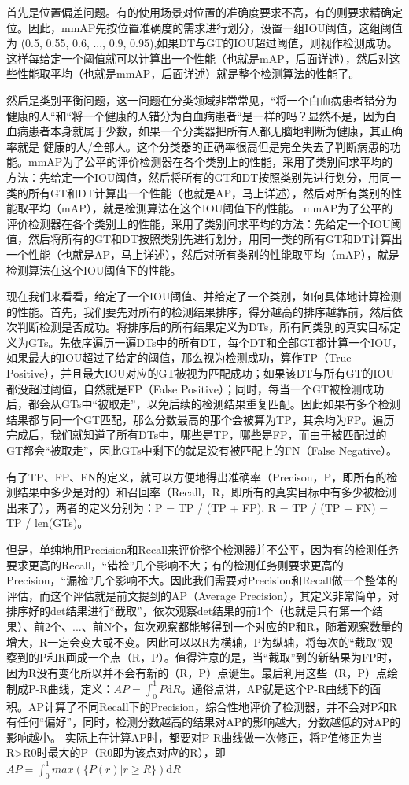 \documentclass[UTF8]{ctexart}
\begin{document}
首先是位置偏差问题。有的使用场景对位置的准确度要求不高，有的则要求精确定位。因此，mmAP先按位置准确度的需求进行划分，设置一组IOU阈值，这组阈值为 (0.5, 0.55, 0.6, ..., 0.9,
0.95),如果DT与GT的IOU超过阈值，则视作检测成功。这样每给定一个阈值就可以计算出一个性能（也就是mAP，后面详述），然后对这些性能取平均（也就是mmAP，后面详述）就是整个检测算法的性能了。

然后是类别平衡问题，这一问题在分类领域非常常见，“将一个白血病患者错分为健康的人“和“将一个健康的人错分为白血病患者“是一样的吗？显然不是，因为白血病患者本身就属于少数，如果一个分类器把所有人都无脑地判断为健康，其正确率就是 健康的人/全部人。这个分类器的正确率很高但是完全失去了判断病患的功能。mmAP为了公平的评价检测器在各个类别上的性能，采用了类别间求平均的方法：先给定一个IOU阈值，然后将所有的GT和DT按照类别先进行划分，用同一类的所有GT和DT计算出一个性能（也就是AP，马上详述），然后对所有类别的性能取平均（mAP），就是检测算法在这个IOU阈值下的性能。
mmAP为了公平的评价检测器在各个类别上的性能，采用了类别间求平均的方法：先给定一个IOU阈值，然后将所有的GT和DT按照类别先进行划分，用同一类的所有GT和DT计算出一个性能（也就是AP，马上详述），然后对所有类别的性能取平均（mAP），就是检测算法在这个IOU阈值下的性能。

现在我们来看看，给定了一个IOU阈值、并给定了一个类别，如何具体地计算检测的性能。首先，我们要先对所有的检测结果排序，得分越高的排序越靠前，然后依次判断检测是否成功。将排序后的所有结果定义为DTs，所有同类别的真实目标定义为GTs。先依序遍历一遍DTs中的所有DT，每个DT和全部GT都计算一个IOU，如果最大的IOU超过了给定的阈值，那么视为检测成功，算作TP（True Positive），并且最大IOU对应的GT被视为匹配成功；如果该DT与所有GT的IOU都没超过阈值，自然就是FP（False Positive）；同时，每当一个GT被检测成功后，都会从GTs中“被取走”，以免后续的检测结果重复匹配。因此如果有多个检测结果都与同一个GT匹配，那么分数最高的那个会被算为TP，其余均为FP。遍历完成后，我们就知道了所有DTs中，哪些是TP，哪些是FP，而由于被匹配过的GT都会“被取走”，因此GTs中剩下的就是没有被匹配上的FN（False Negative）。

有了TP、FP、FN的定义，就可以方便地得出准确率（Precison，P，即所有的检测结果中多少是对的）和召回率（Recall，R，即所有的真实目标中有多少被检测出来了），两者的定义分别为：P = TP / (TP + FP), R = TP / (TP + FN) = TP / len(GTs)。

但是，单纯地用Precision和Recall来评价整个检测器并不公平，因为有的检测任务要求更高的Recall，“错检”几个影响不大；有的检测任务则要求更高的Precision，“漏检”几个影响不大。因此我们需要对Precision和Recall做一个整体的评估，而这个评估就是前文提到的AP（Average Precision），其定义非常简单，对排序好的det结果进行“截取”，依次观察det结果的前1个（也就是只有第一个结果）、前2个、...、前N个，每次观察都能够得到一个对应的P和R，随着观察数量的增大，R一定会变大或不变。因此可以以R为横轴，P为纵轴，将每次的“截取”观察到的P和R画成一个点（R，P）。值得注意的是，当“截取”到的新结果为FP时，因为R没有变化所以并不会有新的（R，P）点诞生。最后利用这些（R，P）点绘制成P-R曲线，定义：$AP=\int_{0}^{1}P\mathrm{d}R$。通俗点讲，AP就是这个P-R曲线下的面积。AP计算了不同Recall下的Precision，综合性地评价了检测器，并不会对P和R有任何“偏好”，同时，检测分数越高的结果对AP的影响越大，分数越低的对AP的影响越小。
实际上在计算AP时，都要对P-R曲线做一次修正，将P值修正为当R>R0时最大的P（R0即为该点对应的R），即 $AP=\int_{0}^{1}max(\{P(r)|r \geq R\})\mathrm{d}R$
\end{document}
